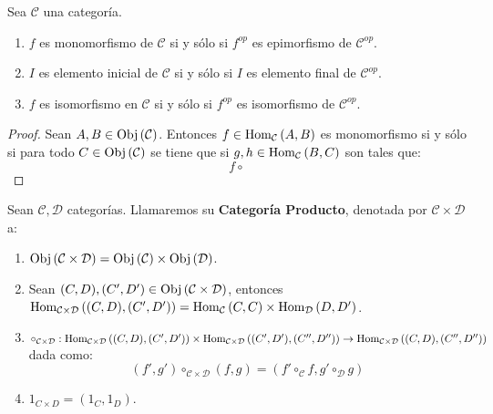 \documentclass[12pt]{report}
\theoremstyle{largebreak}
\newcommand\cf[3]{\ensuremath{#1:#2\rightarrow#3}}
\newcommand{\Obj}[1]{\ensuremath{\textup{Obj}\left(#1\right)}}
\newcommand{\Hom}[3]{\ensuremath{\textup{Hom}_{#1}\left(#2,#3\right)}}
\begin{document}
    \begin{propo}
        Sea $\mathcal{C}$ una categoría.
        \begin{enumerate}
            \item $f$ es monomorfismo de $\mathcal{C}$ si y sólo si $f^{op}$ es epimorfismo de $\mathcal{C}^{op}$.
            \item $I$ es elemento inicial de $\mathcal{C}$ si y sólo si $I$ es elemento final de $\mathcal{C}^{op}$.
            \item $f$ es isomorfismo en $\mathcal{C}$ si y sólo si $f^{op}$ es isomorfismo de $\mathcal{C}^{op}$.
        \end{enumerate}
    \end{propo}

    \begin{proof}
        Sean $A,B\in\Obj{\mathcal{C}}$. Entonces $f\in\Hom{\mathcal{C}}{A}{B}$ es monomorfismo si y sólo si para todo $C\in\Obj{\mathcal{C}}$ se tiene que si $g,h\in\Hom{\mathcal{C}}{B}{C}$ son tales que:
        \begin{equation*}
            f\circ 
        \end{equation*}
    \end{proof}

    \begin{mydef}
        Sean $\mathcal{C},\mathcal{D}$ categorías. Llamaremos su \textbf{Categoría Producto}, denotada por $\mathcal{C}\times\mathcal{D}$ a:
        \begin{enumerate}
            \item $\Obj{\mathcal{C}\times\mathcal{D}}=\Obj{\mathcal{C}}\times\Obj{\mathcal{D}}$.
            \item Sean $(C,D),(C',D')\in\Obj{\mathcal{C}\times\mathcal{D}}$, entonces $\Hom{\mathcal{C}\times\mathcal{D}}{(C,D)}{(C',D')}=\Hom{\mathcal{C}}{C}{C}\times\Hom{\mathcal{D}}{D}{D'}$.
            \item $\cf{\circ_{\mathcal{C}\times\mathcal{D}}}{\Hom{\mathcal{C}\times\mathcal{D}}{(C,D)}{(C',D')}\times\Hom{\mathcal{C}\times\mathcal{D}}{(C',D')}{(C'',D'')}}{\Hom{\mathcal{C}\times\mathcal{D}}{(C,D)}{(C'',D'')}}$ dada como:
            \begin{equation*}
                (f',g')\circ_{\mathcal{C}\times\mathcal{D}}(f,g)=(f'\circ_{\mathcal{C}} f,g'\circ_{\mathcal{D}} g)
            \end{equation*}
            \item $1_{C\times D}=(1_C,1_D)$.
        \end{enumerate}
    \end{mydef}
\end{document}
